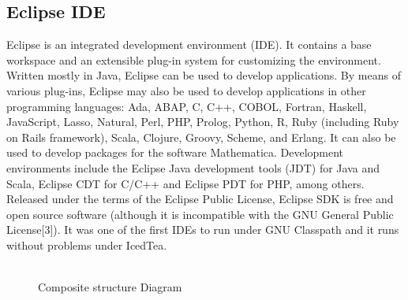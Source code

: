 \documentclass{SureshLimkar}
\begin{document}
\subsection{Eclipse IDE}
\hspace{0.5 in}Eclipse is an integrated development environment (IDE). It contains a base workspace and an extensible plug-in system for customizing the environment. Written mostly in Java, Eclipse can be used to develop applications. By means of various plug-ins, Eclipse may also be used to develop applications in other programming languages: Ada, ABAP, C, C++, COBOL, Fortran, Haskell, JavaScript, Lasso, Natural, Perl, PHP, Prolog, Python, R, Ruby (including Ruby on Rails framework), Scala, Clojure, Groovy, Scheme, and Erlang. It can also be used to develop packages for the software Mathematica. Development environments include the Eclipse Java development tools (JDT) for Java and Scala, Eclipse CDT for C/C++ and Eclipse PDT for PHP, among others.
\hspace{0.5 in}Released under the terms of the Eclipse Public License, Eclipse SDK is free and open source software (although it is incompatible with the GNU General Public License[3]). It was one of the first IDEs to run under GNU Classpath and it runs without problems under IcedTea.
\\ \\
\begin{figure}[h]%
\centering
{}%
\caption{Composite structure Diagram}%
\label{Composite Structure Diagram}%
\end{figure}
\newpage
\end{document}
